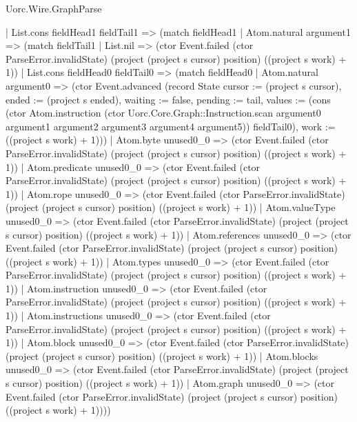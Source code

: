 \begin{lexlean}{Uorc.Wire.GraphParse}
\begin{semanticmodule}
{                        | List.cons fieldHead1 fieldTail1 => (match fieldHead1
                          | Atom.natural argument1 => (match fieldTail1
                            | List.nil => (ctor Event.failed (ctor ParseError.invalidState) (project (project s cursor) position) ((project s work) + 1))
                            | List.cons fieldHead0 fieldTail0 => (match fieldHead0
                              | Atom.natural argument0 => (ctor Event.advanced (record State {cursor := (project s cursor), ended := (project s ended), waiting := false, pending := tail, values := (cons (ctor Atom.instruction (ctor Uorc.Core.Graph::Instruction.scan argument0 argument1 argument2 argument3 argument4 argument5)) fieldTail0), work := ((project s work) + 1)}))
                              | Atom.byte unused0_0 => (ctor Event.failed (ctor ParseError.invalidState) (project (project s cursor) position) ((project s work) + 1))
                              | Atom.predicate unused0_0 => (ctor Event.failed (ctor ParseError.invalidState) (project (project s cursor) position) ((project s work) + 1))
                              | Atom.rope unused0_0 => (ctor Event.failed (ctor ParseError.invalidState) (project (project s cursor) position) ((project s work) + 1))
                              | Atom.valueType unused0_0 => (ctor Event.failed (ctor ParseError.invalidState) (project (project s cursor) position) ((project s work) + 1))
                              | Atom.references unused0_0 => (ctor Event.failed (ctor ParseError.invalidState) (project (project s cursor) position) ((project s work) + 1))
                              | Atom.types unused0_0 => (ctor Event.failed (ctor ParseError.invalidState) (project (project s cursor) position) ((project s work) + 1))
                              | Atom.instruction unused0_0 => (ctor Event.failed (ctor ParseError.invalidState) (project (project s cursor) position) ((project s work) + 1))
                              | Atom.instructions unused0_0 => (ctor Event.failed (ctor ParseError.invalidState) (project (project s cursor) position) ((project s work) + 1))
                              | Atom.block unused0_0 => (ctor Event.failed (ctor ParseError.invalidState) (project (project s cursor) position) ((project s work) + 1))
                              | Atom.blocks unused0_0 => (ctor Event.failed (ctor ParseError.invalidState) (project (project s cursor) position) ((project s work) + 1))
                              | Atom.graph unused0_0 => (ctor Event.failed (ctor ParseError.invalidState) (project (project s cursor) position) ((project s work) + 1))))
}
\end{semanticmodule}
\end{lexlean}
